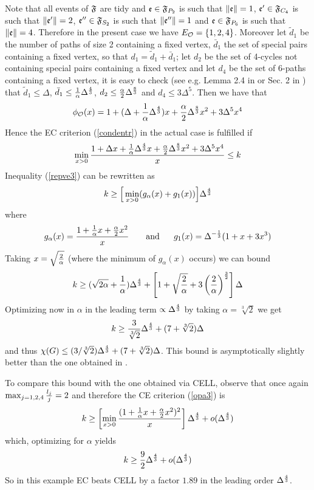 \documentclass[11pt]{article}
\let\a=\alpha \let\b=\beta \let\ch=\chi \let\d=\delta \let\e=\varepsilon
\let\D=\Delta \let\F=\Phi \let\G=\Gamma \let\L=\Lambda \let\Th=\Theta
\let\\=\noindent
\def\ee{\end{equation}}
\def\be{\begin{equation}}
\begin{document}
\\Note that all events of ${\mathfrak{F}}$ are tidy and  ${\mathfrak{e}}\in {\mathfrak{F}}_{P_2}$ is  such that
$\|{\mathfrak{e}}\|=1$, ${\mathfrak{e}}'\in {\mathfrak{F}}_{C_4}$ is such that $\|{\mathfrak{e}}'\|=2$, ${\mathfrak{e}}''\in {\mathfrak{F}}_{S_2}$ is such that $\|{\mathfrak{e}}''\|=1$ and ${\mathfrak{e}}\in {\mathfrak{F}}_{P_6}$
is such that $\|{\mathfrak{e}}\|=4$.
Therefore in the present case  we have $E_{{\mathcal O}}= \{1,2,4\}$.
Moreover let $\tilde d_1$ be the number of paths of size 2 containing a fixed vertex, $\bar d_1$ the set
of special pairs containing a fixed vertex, so that $d_1=\tilde d_1+\bar d_1$; let
$d_2$ be the set of 4-cycles not containing special pairs containing a fixed vertex and let $d_4$
be the set of 6-paths containing a fixed vertex, it is easy to check (see e.g. Lemma 2.4 in \cite{AMR}
or Sec. 2 in \cite{SV})  that $\tilde d_1\le \D$, $\bar d_1\le {1\over \a}\D^{4\over 3}$, $d_2\le {\a\over 2}\D^{8\over 3}$ and $d_4\le 3\D^5$.
Then we have that
$$
\phi_\A(x)= 1+ (\D  +{1\over \a} \D^{4\over 3})x+ {\a\over 2} \D^{8\over 3} x^2 + 3\D^5x^4
$$
Hence the EC criterion  (\ref{condentr}) in the actual case is fulfilled if
\be\label{repve3}
\min_{x>0}{1+ \D x + {1\over \a}\D^{4\over 3}x+ {\a\over 2} \D^{8\over 3} x^2 + 3\D^5x^4\over x}\le k
\ee
Inequality (\ref{repve3}) can be rewritten as
$$
{k}\ge \Big[\min_{x>0}(g_\a(x)+g_1(x))\Big]\D^{4\over 3}
$$
where
$$
g_\a(x)={1+ {1\over \a}x+ {\a\over 2}x^2 \over x} ~~~~~~{\rm and}~~~~~g_1(x) =\D^{-{1\over 3}}(1+x+3x^3)
$$
Taking $x= \sqrt{2\over \a}$ (where   the  minimum  of $g_\a(x)$ occurs) we can bound
$$
{k}\ge (\sqrt{2\a}+{1\over \a})\D^{4\over 3}+ \left[1+\sqrt{2\over \a}+3\left({2\over \a}\right)^{3\over 2}\right]\D
$$
Optimizing now in $\a$ in the leading term $\propto \D^{4\over 3}$ by taking $\a=\sqrt[3]{2}$ we get
\be\label{acyc2}
k\ge {3\over \sqrt[3]{2}} \D^{4\over 3}+ (7+\sqrt[3]{2})\D
\ee
and thus $\chi(G)\le (3/ \sqrt[3]{2}) \D^{4\over 3}+ (7+\sqrt[3]{2})\D$.
This  bound is asymptotically slightly better than the one  obtained in \cite{SV}.

\\To compare this bound with the one obtained via CELL,  observe that  once again  $\max_{j=1,2,4}{l_j\over j}=2$
and therefore  the CE criterion (\ref{opa3}) is
\be\label{ex2aa2cl2}
k\ge \left[\min_{x>0} {(1+ {1\over \a}x+ {\a\over 2}x^2)^2\over x}\right]\D^{4\over 3}+ o(\D^{4\over 3})
\ee
which, optimizing for $\a$ yields
$$
k\ge {9\over 2}{\D^{4\over 3}} + o(\D^{4\over 3})
$$
So in this example  EC beats CELL by a factor $1.89$ in the leading order $\D^{4\over 3}$.


\end{document}
